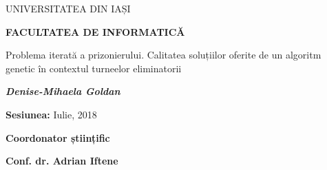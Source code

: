 \begin{center}
	\large{UNIVERSITATEA  DIN IAȘI} \\
	\vspace{0.4cm}
	
	\large{\textbf{FACULTATEA DE INFORMATICĂ}} \\
    \vspace{4cm}
    
	\LARGE{Problema iterată a prizonierului. Calitatea soluțiilor oferite de un algoritm genetic în contextul turneelor eliminatorii} \\
	\vspace{3cm}
	
	\large{\textbf{\textit{Denise-Mihaela Goldan}}}\\
	\vspace{2.5cm}
	
	\large{\textbf{Sesiunea:} Iulie, 2018}\\
	\vspace{2.5cm}
	
	\large{\textbf{Coordonator științific}}\\
	\vspace{0.4cm}
	
	\large{\textbf{Conf. dr. Adrian Iftene}}
\end{center}

\clearpage

